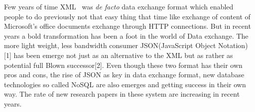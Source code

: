 	Few years of time XML~\cite{www/xml} was  \textit{de facto} data exchange format which enabled people to do previously not that easy thing that time like exchange of content of Microsoft's office documents exchange through HTTP connections. 
	But in recent years a bold transformation has been a foot in the world of Data exchange. The more light weight, less bandwidth consumer JSON(JavaScript Object Notation)[1] has been emerge not just as an alternative to the XML but as rather as potential full Blown successor[2]. Even though these two format has their own pros and cons, the rise of JSON as key in data exchange format, new database technologies so called NoSQL  are also emerges and getting success in their own way. The rate of new research papers in these system are increasing in recent years.